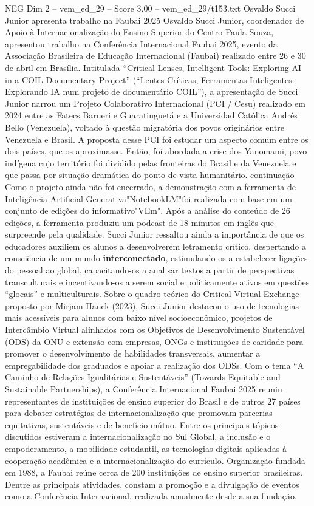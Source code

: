\begin{textsample}{NEG Dim 2 – vem\_ed\_29 – Score 3.00 – vem\_ed\_29/t153.txt}  \label{ex:f2_neg_125}
Osvaldo Succi Junior apresenta trabalho na Faubai 2025 Osvaldo Succi Junior, coordenador de Apoio à Internacionalização do Ensino Superior do Centro Paula Souza, apresentou trabalho na Conferência Internacional Faubai 2025, evento da Associação Brasileira de Educação Internacional (Faubai) realizado entre 26 e 30 de abril em Brasília.
Intitulada “Critical Lenses, Intelligent Tools: Exploring AI in a COIL Documentary Project” (“Lentes Críticas, Ferramentas Inteligentes: Explorando IA num projeto de documentário COIL”), a apresentação de Succi Junior narrou um Projeto Colaborativo Internacional (PCI / Cesu) realizado em 2024 entre as Fatecs Barueri e Guaratinguetá e a Universidad Católica Andrés Bello (Venezuela), voltado à questão migratória dos povos originários entre Venezuela e Brasil.
A proposta desse PCI foi estudar um aspecto comum entre os dois países, que os aproximasse.
Então, foi abordada a crise dos Yanomami, povo indígena cujo território foi dividido pelas fronteiras do Brasil e da Venezuela e que passa por situação dramática do ponto de vista humanitário. continuação Como o projeto ainda não foi encerrado, a demonstração com a ferramenta de Inteligência Artificial Generativa"NotebookLM"foi realizada com base em um conjunto de edições do informativo"VEm".
Após a análise do conteúdo de 26 edições, a ferramenta produziu um podcast de 18 minutos em inglês que surpreende pela qualidade.
Succi Junior ressaltou ainda a importância de que os educadores auxiliem os alunos a desenvolverem letramento crítico, despertando a consciência de um mundo \textbf{interconectado}, estimulando-os a estabelecer ligações do pessoal ao global, capacitando-os a analisar textos a partir de perspectivas transculturais e incentivando-os a serem social e politicamente ativos em questões “glocais” e multiculturais.
Sobre o quadro teórico do Critical Virtual Exchange proposto por Mirjam Hauck (2023), Succi Junior destacou o uso de tecnologias mais acessíveis para alunos com baixo nível socioeconômico, projetos de Intercâmbio Virtual alinhados com os Objetivos de Desenvolvimento Sustentável (ODS) da ONU e extensão com empresas, ONGs e instituições de caridade para promover o desenvolvimento de habilidades transversais, aumentar a empregabilidade dos graduados e apoiar a realização dos ODSs.
Com o tema “A Caminho de Relações Igualitárias e Sustentáveis” (Towards Equitable and Sustainable Partnerships), a Conferência Internacional Faubai 2025 reuniu representantes de instituições de ensino superior do Brasil e de outros 27 países para debater estratégias de internacionalização que promovam parcerias equitativas, sustentáveis e de benefício mútuo.
Entre os principais tópicos discutidos estiveram a internacionalização no Sul Global, a inclusão e o empoderamento, a mobilidade estudantil, as tecnologias digitais aplicadas à cooperação acadêmica e a internacionalização do currículo.
Organização fundada em 1988, a Faubai reúne cerca de 200 instituições de ensino superior brasileiras.
Dentre as principais atividades, constam a promoção e a divulgação de eventos como a Conferência Internacional, realizada anualmente desde a sua fundação.

\end{textsample}
